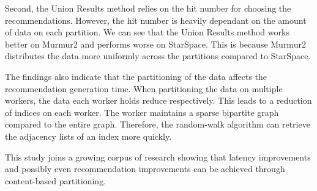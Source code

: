 Second, the Union Results method relies on the hit number for choosing the recommendations. However, the hit number is heavily dependant on the amount of data on each partition. We can see that the Union Results method works better on Murmur2 and performs worse on StarSpace. This is because Murmur2 distributes the data more uniformly across the partitions compared to StarSpace.


The findings also indicate that the partitioning of the data affects the recommendation generation time. When partitioning the data on multiple workers, the data each worker holds reduce respectively. This leads to a reduction of indices on each worker. The worker maintains a sparse bipartite graph compared to the entire graph. Therefore, the random-walk algorithm can retrieve the adjacency lists of an index more quickly.


This study joins a growing corpus of research showing that latency improvements and possibly even recommendation improvements can be achieved through content-based partitioning.
